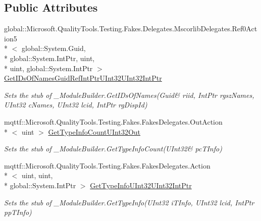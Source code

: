 \subsection*{Public Attributes}
\begin{DoxyCompactItemize}
\item 
global\-::\-Microsoft.\-Quality\-Tools.\-Testing.\-Fakes.\-Delegates.\-Mscorlib\-Delegates.\-Ref0\-Action5\\*
$<$ global\-::\-System.\-Guid, \\*
global\-::\-System.\-Int\-Ptr, uint, \\*
uint, global\-::\-System.\-Int\-Ptr $>$ \hyperlink{class_system_1_1_runtime_1_1_interop_services_1_1_fakes_1_1_stub___module_builder_a24f7e1349d04e8171ee162a9504007f0}{Get\-I\-Ds\-Of\-Names\-Guid\-Ref\-Int\-Ptr\-U\-Int32\-U\-Int32\-Int\-Ptr}
\begin{DoxyCompactList}\small\item\em Sets the stub of \-\_\-\-Module\-Builder.\-Get\-I\-Ds\-Of\-Names(Guid\& riid, Int\-Ptr rgsz\-Names, U\-Int32 c\-Names, U\-Int32 lcid, Int\-Ptr rg\-Disp\-Id)\end{DoxyCompactList}\item 
mqttf\-::\-Microsoft.\-Quality\-Tools.\-Testing.\-Fakes.\-Fakes\-Delegates.\-Out\-Action\\*
$<$ uint $>$ \hyperlink{class_system_1_1_runtime_1_1_interop_services_1_1_fakes_1_1_stub___module_builder_a611c5e49ef27241cb50cfcac8407e0cb}{Get\-Type\-Info\-Count\-U\-Int32\-Out}
\begin{DoxyCompactList}\small\item\em Sets the stub of \-\_\-\-Module\-Builder.\-Get\-Type\-Info\-Count(U\-Int32\& pc\-T\-Info)\end{DoxyCompactList}\item 
mqttf\-::\-Microsoft.\-Quality\-Tools.\-Testing.\-Fakes.\-Fakes\-Delegates.\-Action\\*
$<$ uint, uint, \\*
global\-::\-System.\-Int\-Ptr $>$ \hyperlink{class_system_1_1_runtime_1_1_interop_services_1_1_fakes_1_1_stub___module_builder_a860a2be2e43a77d5f4a28803c6fb7b98}{Get\-Type\-Info\-U\-Int32\-U\-Int32\-Int\-Ptr}
\begin{DoxyCompactList}\small\item\em Sets the stub of \-\_\-\-Module\-Builder.\-Get\-Type\-Info(\-U\-Int32 i\-T\-Info, U\-Int32 lcid, Int\-Ptr pp\-T\-Info)\end{DoxyCompactList}\item 

\end{DoxyCompactItemize}
